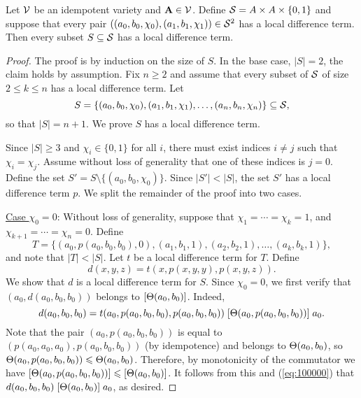 \begin{thm} %
  \label{thm:local-diff-terms}
  Let $\mathcal{V}$ be an idempotent variety and
  $\mathbf{A} \in \mathcal{V}$. Define
  $\mathcal{S}= A \times A \times \{0,1\}$
  and suppose that every pair
  $((a_0, b_0, \chi_0), (a_1, b_1, \chi_1)) \in \mathcal{S}^2$
  has a local difference term.
  Then every subset $S \subseteq \mathcal{S}$
  has a local difference term.
\end{thm}
\begin{proof}
The proof is by induction on the size of $S$.  In the base case, $|S| = 2$,
the claim holds by assumption.
Fix $n\geq 2$ and assume that every subset of $\mathcal{S}$ of size $2\leq k \leq n$ has a local
difference term. Let
\[
S = \{(a_0, b_0, \chi_0), (a_1, b_1, \chi_1), \dots, (a_{n}, b_{n},\chi_{n})\} \subseteq \mathcal{S},\]
so that $|S| = n+1$.  We prove $S$ has a local difference term.

Since $|S| \geq 3$ and $\chi_i \in \{0,1\}$ for all $i$, there must exist
indices $i\neq j$ such that $\chi_i = \chi_j$. Assume without loss of generality
that one of these indices is $j=0$.  Define
the set
$S' = S \setminus \{(a_0, b_0, \chi_0)\}$.
Since $|S'| < |S|$, the set $S'$ has a local difference term $p$.
We split the remainder of the proof into two cases.

\medskip

\noindent \underline{Case $\chi_0 = 0$}:
Without loss of generality, suppose that $\chi_1 = %
\cdots =\chi_k = 1$,
and $\chi_{k+1} %
= \cdots = \chi_{n} = 0$. Define %
\[T = \{(a_0, p(a_0, b_0, b_0), 0),
(a_1, b_1, 1), (a_2, b_2, 1),
\dots, (a_k, b_k, 1)\},\] and
note that $|T| < |S|$.
Let $t$ be a local difference term for $T$.
Define
\[
d(x,y,z) = t(x, p(x,y,y), p(x,y,z)).
\]
We show that $d$ is a local difference term for $S$.
Since $\chi_0 =0$, we first verify that
$(a_0, d(a_0,b_0,b_0))$ belongs to $[\Theta(a_0,b_0)]$.
Indeed,
\begin{equation}
    \label{eq:100000}
  d(a_0,b_0,b_0) =
  t(a_0, p(a_0,b_0,b_0), p(a_0,b_0,b_0))\mathrel{[\Theta(a_0, p(a_0,b_0,b_0))]} a_0.
\end{equation}
Note that the pair $(a_0, p(a_0,b_0,b_0))$ is equal to
$(p(a_0,a_0,a_0), p(a_0,b_0,b_0))$ (by idempotence) and
belongs to $\Theta(a_0, b_0)$, so $\Theta(a_0, p(a_0,b_0,b_0))\leqslant \Theta(a_0,b_0)$.
Therefore,
by monotonicity of the commutator we have
$[\Theta(a_0, p(a_0,b_0,b_0))] \leqslant [\Theta(a_0,b_0)]$.
It follows from this and (\ref{eq:100000}) that
$d(a_0,b_0,b_0)\mathrel{[\Theta(a_0,b_0)]} a_0$, as desired.


\end{proof}
